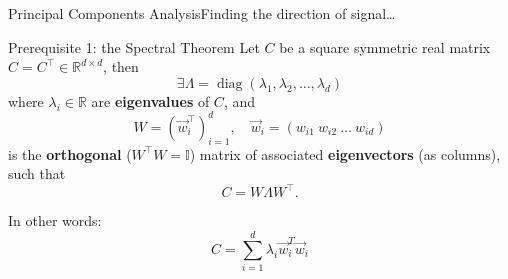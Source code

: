 \begin{frame}{Principal Components Analysis}{Finding the direction of signal\dots}
    \begin{block}{Prerequisite 1: the Spectral Theorem}
        Let $C$ be a square symmetric real matrix $C = C^{\top} \in \mathbb{R}^{d \times d}$, then
        \begin{equation*}
            \exists \Lambda = \operatorname{diag}\left( \lambda_1, \lambda_2, \dots, \lambda_d \right)
        \end{equation*}
        where $\lambda_i \in \mathbb{R}$ are \textbf{eigenvalues} of $C$, and
        \begin{equation*}
            W = \left( \vec{w}_i^{\top} \right)_{i = 1}^d,
            \quad
            \vec{w}_i = \left( w_{i1}~w_{i2}~\dots~w_{id} \right)
        \end{equation*}
        is the \textbf{orthogonal} ($W^{\top} W = \mathbb{I}$) matrix of associated \textbf{eigenvectors} (as columns), such that
        \begin{equation*}
            C = W \Lambda W^{\top}.
        \end{equation*}
    \end{block}

    \vfill

    In other words:
    \begin{equation*}
        C = \sum\limits_{i = 1}^d \lambda_i \vec{w}_i^T \vec{w}_i
    \end{equation*}
\end{frame}


